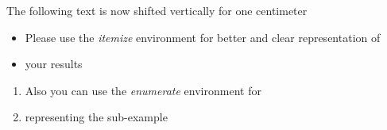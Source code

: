 \documentclass[parskip=full]{scrartcl}
\begin{document}
The following text is now shifted vertically for one centimeter

\begin{itemize}
	\item Please use the \textit{itemize} environment for better and clear representation of
	\item your results
\end{itemize}

\begin{enumerate}
	\item Also you can use the \textit{enumerate} environment for 
	\item representing the sub-example
\end{enumerate}





\end{document}
